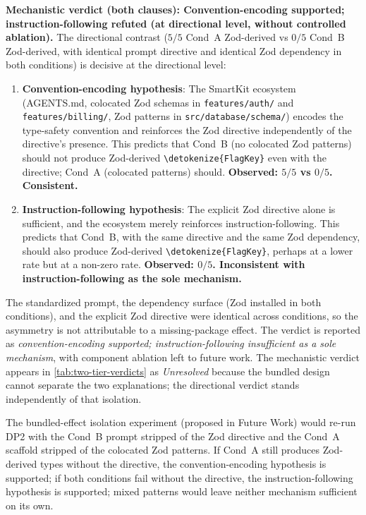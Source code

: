 \documentclass[12pt,a4paper]{report}
\newcommand{\code}[1]{\texttt{\nolinkurl{\detokenize{#1}}}}
\DeclareRobustCommand{\filename}[1]{\bgroup\urlstyle{tt}\nolinkurl{#1}\egroup}
\begin{document}
\textbf{Mechanistic verdict (both clauses): Convention-encoding supported; instruction-following refuted (at directional level, without controlled ablation).} The directional contrast ($5/5$ Cond~A Zod-derived vs $0/5$ Cond~B Zod-derived, with identical prompt directive and identical Zod dependency in both conditions) is decisive at the directional level:

\begin{enumerate}
    \item \textbf{Convention-encoding hypothesis}: The SmartKit ecosystem (AGENTS.md, colocated Zod schemas in \filename{features/auth/} and \filename{features/billing/}, Zod patterns in \filename{src/database/schema/}) encodes the type-safety convention and reinforces the Zod directive independently of the directive's presence. This predicts that Cond~B (no colocated Zod patterns) should not produce Zod-derived \code{FlagKey} even with the directive; Cond~A (colocated patterns) should. \textbf{Observed: $5/5$ vs $0/5$. Consistent.}
    \item \textbf{Instruction-following hypothesis}: The explicit Zod directive alone is sufficient, and the ecosystem merely reinforces instruction-following. This predicts that Cond~B, with the same directive and the same Zod dependency, should also produce Zod-derived \code{FlagKey}, perhaps at a lower rate but at a non-zero rate. \textbf{Observed: $0/5$. Inconsistent with instruction-following as the sole mechanism.}
\end{enumerate}

The standardized prompt, the dependency surface (Zod installed in both conditions), and the explicit Zod directive were identical across conditions, so the asymmetry is not attributable to a missing-package effect. The verdict is reported as \emph{convention-encoding supported; instruction-following insufficient as a sole mechanism}, with component ablation left to future work. The mechanistic verdict appears in \autoref{tab:two-tier-verdicts} as \emph{Unresolved} because the bundled design cannot separate the two explanations; the directional verdict stands independently of that isolation.

The bundled-effect isolation experiment (proposed in Future Work) would re-run DP2 with the Cond~B prompt stripped of the Zod directive and the Cond~A scaffold stripped of the colocated Zod patterns. If Cond~A still produces Zod-derived types without the directive, the convention-encoding hypothesis is supported; if both conditions fail without the directive, the instruction-following hypothesis is supported; mixed patterns would leave neither mechanism sufficient on its own.
\end{document}
